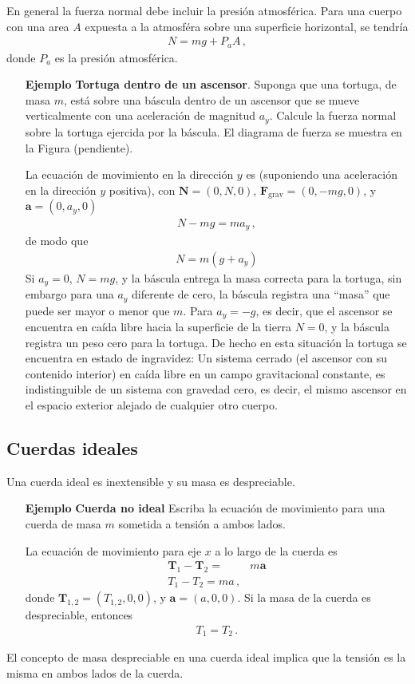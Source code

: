 En general la fuerza normal debe incluir la presión atmosférica. Para una cuerpo con una area $A$ expuesta a la atmosféra sobre una superficie horizontal, se tendría 
\begin{align}
 N=mg+P_a A\,, 
\end{align}
donde $P_a$ es la presión atmosférica. 
\begin{itemize}
\item[\textbf{Ejemplo}] \textbf{Tortuga dentro de un ascensor}. Suponga que una tortuga, de masa $m$, está sobre una báscula dentro de un ascensor que se mueve verticalmente con una aceleración de magnitud $a_y$. Calcule la fuerza normal sobre la tortuga ejercida por la báscula. El diagrama de fuerza se muestra en la Figura (pendiente). 

La ecuación de movimiento en la dirección $y$ es (suponiendo una aceleración en la dirección $y$ positiva), con $\mathbf{N}=(0,N,0)$, $\mathbf{F}_{\text{grav}}=(0,-mg,0)$, y $\mathbf{a}=(0,a_y,0)$
\begin{align}
  N-mg=m a_y\,,
\end{align}
de modo que
\begin{align}
  N=m(g+a_y)
\end{align}
Si $a_y=0$, $N=mg$, y la báscula entrega la masa correcta para la
tortuga, sin embargo para una $a_y$ diferente de cero, la báscula
registra una ``masa'' que puede ser mayor o menor que $m$. Para
$a_y=-g$, es decir, que el ascensor se encuentra en caída libre hacia
la superficie de la tierra $N=0$, y la báscula registra un peso cero
para la tortuga. De hecho en esta situación la tortuga se encuentra en
estado de ingravidez: Un sistema cerrado (el ascensor con su contenido
interior) en caída libre en un campo gravitacional constante, es
indistinguible de un sistema con gravedad cero, es decir, el mismo
ascensor en el espacio exterior alejado de cualquier otro cuerpo.
\end{itemize}

\subsection{Cuerdas ideales}
Una cuerda ideal es inextensible y su masa es despreciable. 
\begin{itemize}
\item[\textbf{Ejemplo}] \textbf{Cuerda no ideal}
Escriba la ecuación de movimiento para una cuerda de masa $m$ sometida a tensión a ambos lados. 

La ecuación de movimiento para eje $x$ a lo largo de la cuerda es 
\begin{align*}
  \mathbf{T}_1-\mathbf{T}_2=&m\mathbf{a}\nonumber\\
  T_1-T_2=m a\,,
\end{align*}
donde $\mathbf{T}_{1,2}=(T_{1,2},0,0)$, y $\mathbf{a}=(a,0,0)$. Si la masa de la cuerda es despreciable, entonces
\begin{align*}
  T_1=T_2\,.
\end{align*}


\end{itemize}
El concepto de masa despreciable en una cuerda ideal implica que la tensión es la misma en ambos lados de la cuerda. 

